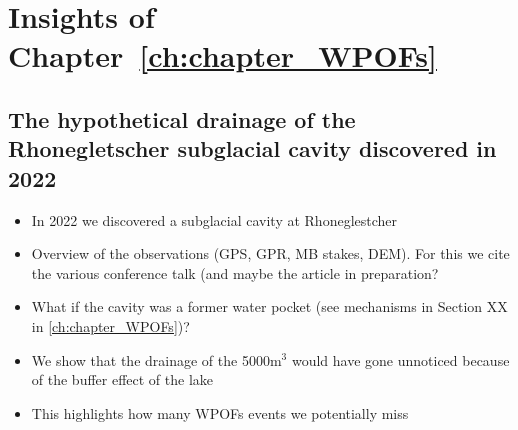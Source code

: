 \section{Insights of Chapter~\ref{ch:chapter_WPOFs}}

\subsection{ The hypothetical drainage of the Rhonegletscher subglacial cavity discovered in 2022}

\begin{itemize}
    \item In 2022 we discovered a subglacial cavity at Rhoneglestcher
    \item Overview of the observations (GPS, GPR, MB stakes, DEM). For this we cite the various conference talk (and maybe the article in preparation?
    \item What if the cavity was a former water pocket (see mechanisms in Section XX in \ref{ch:chapter_WPOFs})? 
    \item We show that the drainage of the 5000m$^3$ would have gone unnoticed because of the buffer effect of the lake
    \item This highlights how many WPOFs events we potentially miss
\end{itemize}








